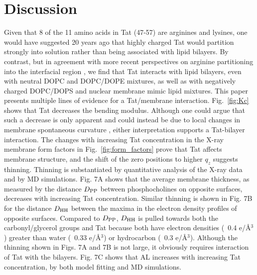 \section{Discussion}\label{sec:discussion}
Given that 8 of the 11 amino acids in Tat (47-57) are arginines and lysines, 
one would have
suggested 20 years ago that highly charged Tat would partition strongly into 
solution rather than
being associated with lipid bilayers. By contrast, but in agreement with more 
recent perspectives
on arginine partitioning into the interfacial region \cite{Johansson09}, 
we find that Tat interacts with lipid bilayers, even with neutral DOPC and 
DOPC/DOPE mixtures, as well as with negatively
charged DOPC/DOPS and nuclear membrane mimic lipid mixtures. 
This paper presents multiple lines of evidence for a Tat/membrane interaction. 
Fig.~\ref{fig:Kc} shows that Tat decreases the bending modulus. 
Although one could argue that such a decrease is only apparent 
and could instead be due to local changes in membrane spontaneous curvature 
\cite{Tristram-Nagle07_BPJ}, either interpretation supports a Tat-bilayer 
interaction. The changes with increasing Tat concentration in the X-ray
membrane form factors in Fig.~\ref{fig:form_factors} prove that Tat affects 
membrane structure, and the shift of the zero positions to higher $q_z$ 
suggests thinning. Thinning is substantiated by quantitative analysis
of the X-ray data and by MD simulations. Fig. 7A shows that the average 
membrane thickness, as measured by the distance $D_\textrm{PP}$ between phosphocholines 
on opposite surfaces, decreases with increasing Tat concentration. Similar 
thinning is shown in Fig. 7B for the distance $D_\textrm{HH}$ between the maxima in the 
electron density profiles of opposite surfaces. Compared to $D_\textrm{PP}$, $D_\textrm{HH}$ is 
pulled towards both the carbonyl/glycerol groups and Tat because both have 
electron densities (~0.4 e/\AA$^3$) greater than water (~0.33 e/\AA$^3$) or 
hydrocarbon (~0.3 e/\AA$^3$). Although the thinning shown in Figs. 7A and 7B 
is not large, it obviously requires interaction of Tat with the bilayers. 
Fig. 7C shows that AL increases with increasing Tat concentration, by both 
model fitting and MD simulations.

